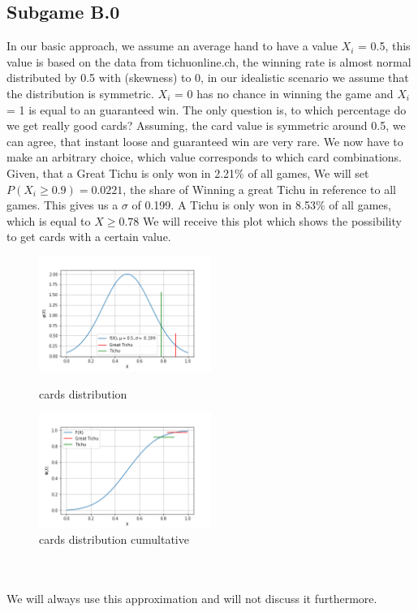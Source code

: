 \subsection{Subgame B.0}
In our basic approach, we assume an average hand to have a value $X_i$ = 0.5, this value is based on the data from tichuonline.ch, the winning rate is almost normal distributed by 0.5 with (skewness) to 0, in our idealistic scenario we assume that the distribution is symmetric. $X_i$ = 0 has no chance in winning the game and $X_i$ = 1 is equal to an guaranteed win. The only question is, to which percentage do we get really good cards? Assuming, the card value is symmetric around 0.5, we can agree, that instant loose and guaranteed win are very rare. We now have to make an arbitrary choice, which value corresponds to which card combinations. 
Given, that a Great Tichu is only won in 2.21$\%$ of all games, We will set $P(X_i \geq 0.9) = 0.0221$, the share of Winning a great Tichu in reference to all games. This gives us a $\sigma$ of 0.199. A Tichu is only won in 8.53$\%$ of all games, which is equal to $X \geq 0.78$
We will receive this plot which shows the possibility to get cards with a certain value.
\begin{figure}[h]
    \centering
    \includegraphics[width=0.5\textwidth]{Bilder/cards_distribution}
    \caption{cards distribution}
    \label{fig:meine-grafik}
    \centering
    \includegraphics[width=0.5\textwidth]{Bilder/cards_distribution_cumultative}
    \caption{cards distribution cumultative}
    \label{fig:meine-grafik}
\end{figure}
\\ \\We will always use this approximation and will not discuss it furthermore.

